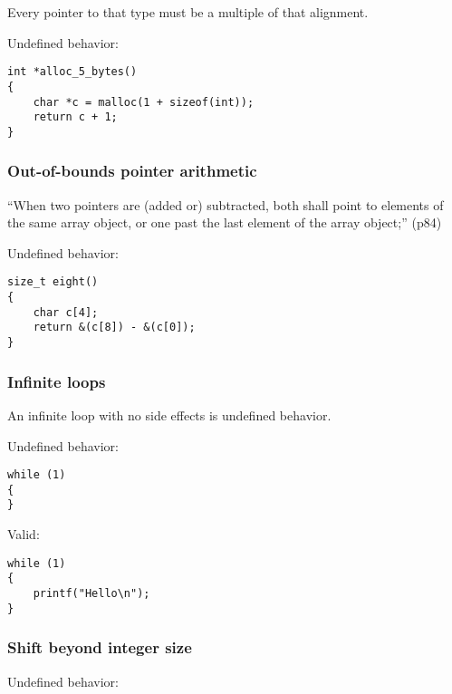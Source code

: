 \documentclass[12pt]{article}
\begin{document}
Every pointer to that type must be a multiple of that alignment. 

Undefined behavior:

\begin{lstlisting}
int *alloc_5_bytes()
{
    char *c = malloc(1 + sizeof(int));
    return c + 1;
}
\end{lstlisting}

\subsubsection{Out-of-bounds pointer arithmetic}

“When two pointers are (added or) subtracted, 
both shall point to elements of the same array object, 
or one past the last element of the array object;” (p84)

Undefined behavior:

\begin{lstlisting}
size_t eight()
{
    char c[4];
    return &(c[8]) - &(c[0]);
}
\end{lstlisting}

\subsubsection{Infinite loops}

An infinite loop with no side effects is undefined behavior.

Undefined behavior:

\begin{lstlisting}
while (1)
{
}
\end{lstlisting}

Valid:

\begin{lstlisting}
while (1)
{
    printf("Hello\n");
}
\end{lstlisting}

\subsubsection{Shift beyond integer size}

Undefined behavior:
\end{document}
